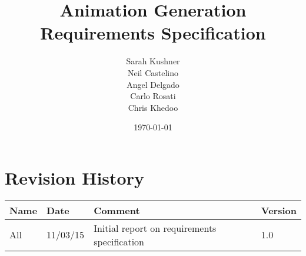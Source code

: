 \documentclass[a4paper]{article}
\begin{document}
\title{Animation Generation Requirements Specification}
\author{Sarah Kushner \\
		Neil Castelino \\
		Angel Delgado \\
		Carlo Rosati \\
		Chris Khedoo}
\date{\today}
\maketitle
\small

\pagebreak
\tableofcontents
\pagebreak
\section{Revision History}
\begin{tabular}{|l|l|l|l|}
\hline
Name	& Date	 		& 	Comment	 								& 	Version	 \\ \hline
All		& 11/03/15		& 	Initial report on requirements specification &  	1.0 	 \\ \hline
\end{tabular}

\pagebreak






%    
%    
\end{document}
